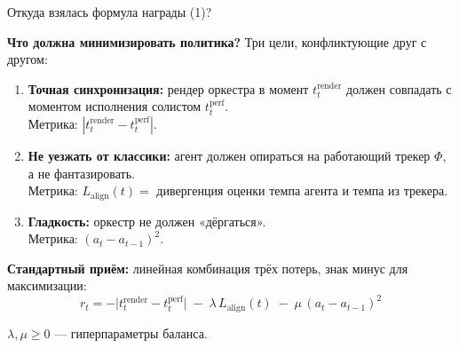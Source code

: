 \begin{frame}{Откуда взялась формула награды (1)?}

\small

\textbf{Что должна минимизировать политика?} Три цели, конфликтующие
друг с другом:

\bigskip

\begin{enumerate}
  \item \textbf{Точная синхронизация:} рендер оркестра в момент
        $t^{\mathrm{render}}_t$ должен совпадать с моментом исполнения
        солистом $t^{\mathrm{perf}}_t$.\\
        Метрика: $|t^{\mathrm{render}}_t - t^{\mathrm{perf}}_t|$.

  \bigskip

  \item \textbf{Не уезжать от классики:} агент должен опираться на
        работающий трекер $\Phi$, а не фантазировать.\\
        Метрика: $L_{\mathrm{align}}(t) = $ дивергенция оценки темпа
        агента и темпа из трекера.

  \bigskip

  \item \textbf{Гладкость:} оркестр не должен «дёргаться».\\
        Метрика: $(a_t - a_{t-1})^2$.
\end{enumerate}

\bigskip

\textbf{Стандартный приём:} линейная комбинация трёх потерь, знак минус
для максимизации:
\[
\boxed{\;
r_t = -\bigl|t^{\mathrm{render}}_t - t^{\mathrm{perf}}_t\bigr|
      \;-\; \lambda\, L_{\mathrm{align}}(t)
      \;-\; \mu\, (a_t - a_{t-1})^2\;}
\]

$\lambda, \mu \ge 0$ --- гиперпараметры баланса.

\end{frame}

